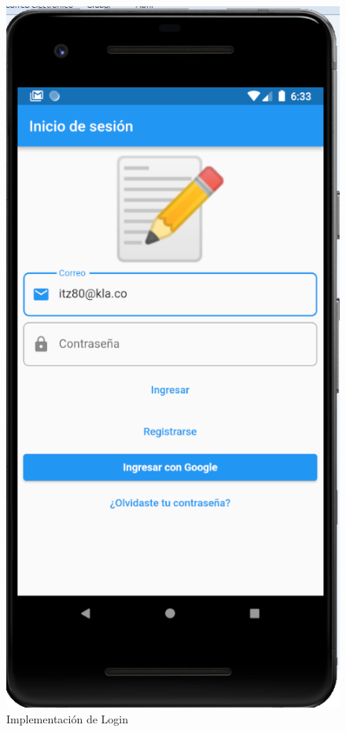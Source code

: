 \documentclass{article}
\begin{document}
\begin{figure}[H]
    \centering
    \includegraphics[scale=0.8]{imgs/Imp/Login1}
    \caption{Implementación de Login}
    \label{fig:implementacion_02}
\end{figure}
\end{document}
